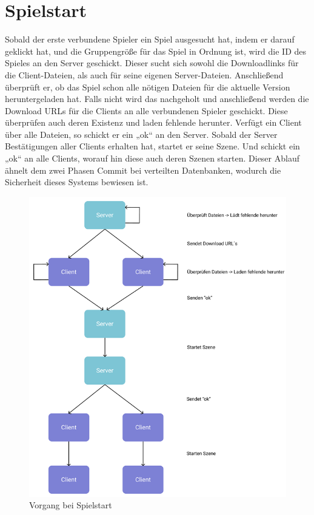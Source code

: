 \section{Spielstart} \label{sec:spielstart}
Sobald der erste verbundene Spieler ein Spiel ausgesucht hat, indem er darauf geklickt hat, und die Gruppengröße für das Spiel in Ordnung ist, wird die ID des Spieles an den Server geschickt.
Dieser sucht sich sowohl die Downloadlinks für die Client-Dateien, als auch für seine eigenen Server-Dateien. Anschließend überprüft er, ob das Spiel schon alle nötigen Dateien für die aktuelle Version heruntergeladen hat. Falls nicht wird das nachgeholt und anschließend werden die Download URLs für die Clients an alle verbundenen Spieler geschickt. Diese überprüfen auch deren Existenz und laden fehlende herunter. Verfügt ein Client über alle Dateien, so schickt er ein „ok“ an den Server. Sobald der Server Bestätigungen aller Clients erhalten hat, startet er seine Szene. Und schickt ein „ok“ an alle Clients, worauf hin diese auch deren Szenen starten. Dieser Ablauf ähnelt dem zwei Phasen Commit bei verteilten Datenbanken, wodurch die Sicherheit dieses Systems bewiesen ist.
\begin{figure}
    \includegraphics{images/spielstart.png}
    \caption{Vorgang bei Spielstart}
    \label{img:spielstart}
\end{figure}
